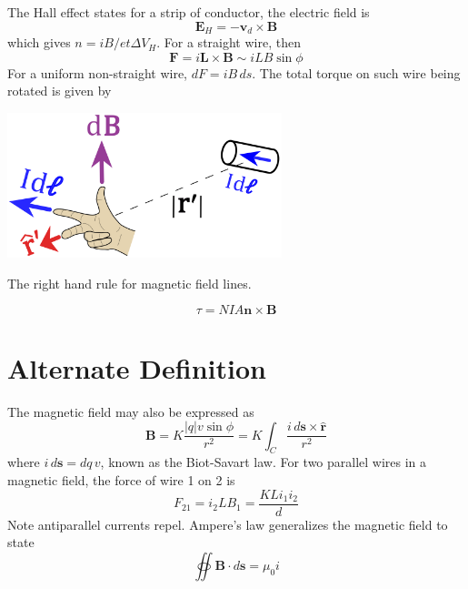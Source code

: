 \documentclass{tufte-book}
\renewcommand{\b}{\mathbf}
\begin{document}
\bigskip
The Hall effect states for a strip of conductor, the electric field is \begin{equation}
    \b E_H = - \b v_d \times \b B
\end{equation}
which gives $n = iB/et \Delta V_H$. For a straight wire, then \begin{equation}
    \b F = i \b L \times \b B \sim iLB \sin \phi
\end{equation}
For a uniform non-straight wire, $dF = iB \, ds$. The total torque on such wire being rotated is given by
%
\begin{marginfigure}
  \includegraphics[width=0.6\textwidth]{rhr}
  \caption{The right hand rule for magnetic field lines.}
\end{marginfigure}
%
\begin{equation}
    \tau = NIA \b n \times \b B
\end{equation}

\section{Alternate Definition}
The magnetic field may also be expressed as \begin{equation}
    \b B = K \frac{|q| v \sin \phi}{r^2} = K \int_C \frac{i \, d \b s \times \mathbf{\hat{r}}}{r^2}
\end{equation}
where $i \, d \b s = dq \, v$, known as the Biot-Savart law. For two parallel wires in a magnetic field, the force of wire 1 on 2 is \begin{equation}
    F_{21} = i_2 LB_1 = \frac{KL i_1i_2}{d}
\end{equation}
Note antiparallel currents repel. Ampere's law generalizes the magnetic field to state \begin{equation}
    \oiint \b B \cdot d \b s = \mu_0 i
\end{equation}
\end{document}
